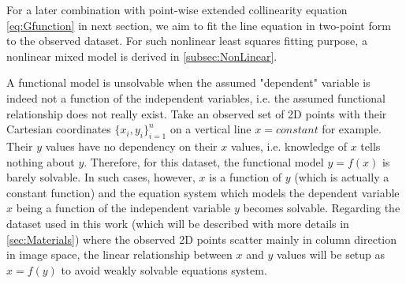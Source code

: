 For a later combination with point-wise extended collinearity equation \eqref{eq:Gfunction} in next section, we aim to fit the line equation in two-point form to the observed dataset. 
For such nonlinear least squares fitting purpose, a nonlinear mixed model is derived in \cref{subsec:NonLinear}. %

A functional model is unsolvable when the assumed "dependent" variable is indeed not a function of the independent variables, i.e. the assumed functional relationship does not really exist. Take an observed set of 2D points with their Cartesian coordinates $\{x_i,y_i\}^n_{i=1}$ on a vertical line $x=constant$ for example. Their $y$ values have no dependency on their $x$ values, i.e. knowledge of $x$ tells nothing about $y$. Therefore, for this dataset, the functional model $y=f(x)$ is barely solvable. In such cases, however, $x$ is a function of $y$ (which is actually a constant function) and the equation system which models the dependent variable $x$ being a function of the independent variable $y$ becomes solvable. Regarding the dataset used in this work (which will be described with more details in \cref{sec:Materials}) where the observed 2D points scatter mainly in column direction in image space, the linear relationship between $x$ and $y$ values will be setup as $x=f(y)$ to avoid weakly solvable equations system.






